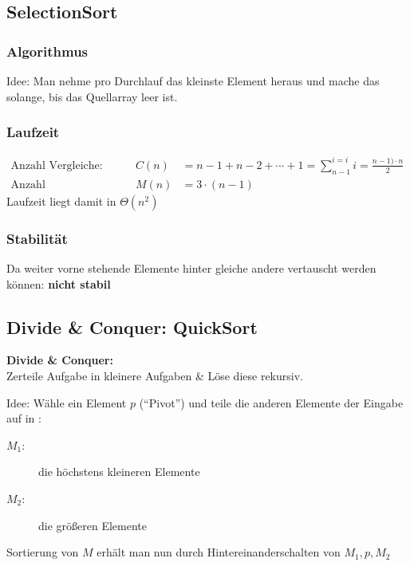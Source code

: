 \documentclass{scrartcl}
\begin{document}
\subsection{SelectionSort}
\subsubsection{Algorithmus}
Idee: Man nehme pro Durchlauf das kleinste Element heraus und mache das solange, bis das Quellarray leer ist.

\subsubsection{Laufzeit}
\begin{align*}
\textrm{Anzahl Vergleiche:} & & C(n) &= n-1 + n-2 + \cdots + 1 = \sum_{n-1}^{i=i}i = \frac{n-1)\cdot n}{2} \\
\textrm{Anzahl Umspeicherungen:} & & M(n) &= 3\cdot (n-1)
\end{align*}
Laufzeit liegt damit in $\Theta(n^2)$
\subsubsection{Stabilität}
Da weiter vorne stehende Elemente hinter gleiche andere vertauscht werden können: \textbf{nicht stabil}

\subsection{Divide \& Conquer: QuickSort}
\begin{shaded}
\textbf{Divide \& Conquer:} \\ Zerteile Aufgabe in kleinere Aufgaben \& Löse diese rekursiv.
\end{shaded}

Idee: Wähle ein Element $p$ ("`Pivot"') und teile die anderen Elemente der Eingabe auf in :
\begin{description}
	\item[$M_1$:] die höchstens kleineren Elemente
	\item[$M_2$:] die größeren Elemente
\end{description}
Sortierung von $M$ erhält man nun durch Hintereinanderschalten von $M_1,p,M_2$
\end{document}
